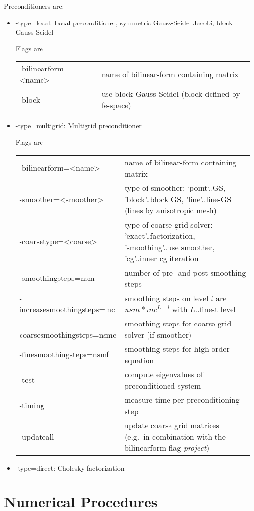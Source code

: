 \documentclass[12pt]{book}
\begin{document}
Preconditioners are:
\begin{itemize}
\item 
-type=local: Local preconditioner, symmetric Gauss-Seidel Jacobi, block Gauss-Seidel

Flags are
\begin{tabular}{|l|l|}
\hline
-bilinearform=<name> & name of bilinear-form containing matrix \\
-block & use block Gauss-Seidel (block defined by fe-space)
\end{tabular}


\item
-type=multigrid: Multigrid preconditioner

Flags are
\begin{tabular}{|l|l|}
-bilinearform=<name> & name of bilinear-form containing matrix \\
-smoother=<smoother> & type of smoother: 'point'..GS, 'block'..block GS, 'line'..line-GS (lines by anisotropic mesh) \\
-coarsetype=<coarse> & type of coarse grid solver: 'exact'..factorization, 'smoothing'..use smoother, 'cg'..inner cg iteration \\
-smoothingsteps=nsm   & number of pre- and post-smoothing steps \\
-increasesmoothingsteps=inc & smoothing steps on level $l$ are $nsm * inc^{L-l}$ with $L$..finest level\\
-coarsesmoothingsteps=nsmc & smoothing steps for coarse grid solver (if smoother) \\
-finesmoothingsteps=nsmf & smoothing steps for high order equation \\
-test & compute eigenvalues of preconditioned system \\
-timing & measure time per preconditioning step \\
-updateall & update coarse grid matrices (e.g.\ in combination with the bilinearform flag {\it project}) \\
\hline
\end{tabular}

\item -type=direct: Cholesky factorization

\end{itemize}

\section{Numerical Procedures}
\end{document}
